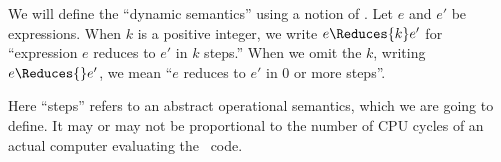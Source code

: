 \begin{node}\label{sml-0005}%
We will define the ``dynamic semantics'' using a notion of
. Let $e$ and $e'$ be expressions. When $k$ is a
positive integer, we write $e\Reduces{k}e'$ for ``expression $e$ reduces
to $e'$ in $k$ steps.'' When we omit the $k$, writing $e\Reduces{}e'$,
we mean ``$e$ reduces to $e'$ in $0$ or more steps''.

Here ``steps'' refers to an abstract operational semantics, which we are
going to define. It may or may not be proportional to the number of CPU
cycles of an actual computer evaluating the \SML\ code.
\end{node}
